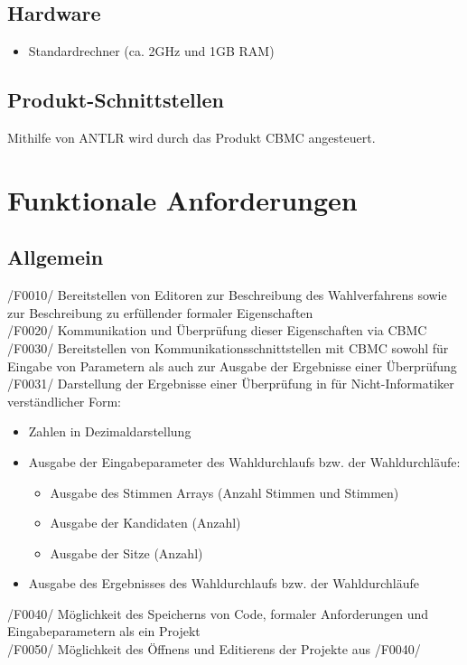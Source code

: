 \documentclass[a4paper]{scrreprt}
\begin{document}
\section{Hardware}
\begin{itemize}
\item Standardrechner (ca. 2GHz und 1GB RAM)
\end{itemize}

\section{Produkt-Schnittstellen}
Mithilfe von ANTLR wird durch das Produkt \ac{CBMC} angesteuert.

\chapter{Funktionale Anforderungen}
\section{Allgemein}
/F0010/ Bereitstellen von Editoren zur Beschreibung des Wahlverfahrens sowie zur Beschreibung zu erfüllender formaler Eigenschaften \\
/F0020/ Kommunikation und Überprüfung dieser Eigenschaften via \ac{CBMC} \\
/F0030/ Bereitstellen von Kommunikationsschnittstellen mit \ac{CBMC} sowohl für Eingabe von Parametern als auch zur Ausgabe der Ergebnisse einer Überprüfung \\
/F0031/ Darstellung der Ergebnisse einer Überprüfung in für Nicht-Informatiker verständlicher Form:
\begin{itemize}
\item Zahlen in Dezimaldarstellung
\item Ausgabe der Eingabeparameter des Wahldurchlaufs bzw. der Wahldurchläufe:
\begin{itemize}
\item Ausgabe des Stimmen Arrays (Anzahl Stimmen und Stimmen) 
\item Ausgabe der Kandidaten (Anzahl)
\item Ausgabe der Sitze (Anzahl)
\end{itemize}
\item Ausgabe des Ergebnisses des Wahldurchlaufs bzw. der Wahldurchläufe
\end{itemize} 
/F0040/ Möglichkeit des Speicherns von Code, formaler Anforderungen und Eingabeparametern als ein Projekt \\
/F0050/ Möglichkeit des Öffnens und Editierens der Projekte aus /F0040/
\end{document}
